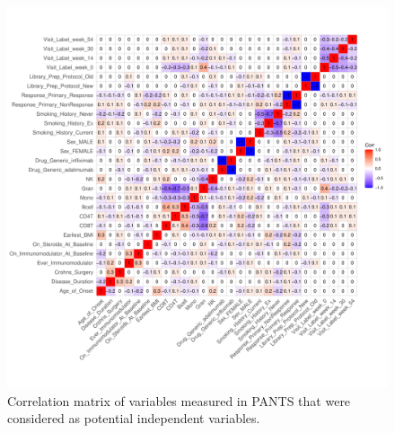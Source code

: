 \begin{figure}
    \centering
    \includegraphics[width=1.0\textwidth,page=1]{mainmatter/figures/chapter_04/process_pheno.pheno_filtered_dge.ggcorrplot.pdf}
    \caption{Correlation matrix of variables measured in \gls{PANTS} that were considered as potential independent variables.}
    \label{fig:multipants_pheno_filtered_ggcorrplot}
\end{figure}



